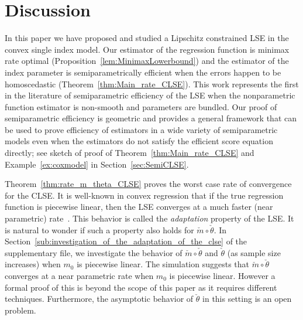 {\section{Discussion} \label{sec:discussion}
  In this paper we have proposed and studied a Lipschitz constrained LSE in the convex single index model. Our estimator  of the regression function is minimax rate optimal (Proposition~\ref{lem:MinimaxLowerbound}) and  the estimator of the index parameter is semiparametrically efficient when the errors happen to be homoscedastic (Theorem~\ref{thm:Main_rate_CLSE}). This work represents the first in the literature of semiparametric efficiency of the LSE when the nonparametric function estimator is non-smooth and parameters are bundled. Our proof of semiparametric efficiency is geometric and provides a general framework that can be used to prove efficiency of estimators in a wide variety of semiparametric models even when the estimators do not satisfy the efficient score equation directly; see sketch of proof of Theorem~\ref{thm:Main_rate_CLSE} and Example~\ref{ex:coxmodel} in Section~\ref{sec:SemiCLSE}. 



{Theorem~\ref{thm:rate_m_theta_CLSE} proves the worst case rate of convergence for the CLSE.  It is well-known in convex regression that if the true regression function is piecewise linear, then the LSE converges at a much faster (near parametric) rate~\cite{MR3881209}. This behavior is called the \emph{adaptation} property of the LSE.
It is natural to wonder if such a property also holds for $\check{m}\circ\check\theta$. In Section~\ref{sub:investigation_of_the_adaptation_of_the_clse} of the supplementary file, we investigate the behavior of  $\check{m}\circ\check\theta$ and $\check{\theta}$ (as sample size increases) when $m_0$ is piecewise linear. The simulation suggests that $\check{m}\circ\check{\theta}$ converges at a near parametric rate when $m_0$ is piecewise linear. However a formal proof of this is beyond the scope of this paper as it requires different techniques. Furthermore, the asymptotic behavior of $\check \theta$ in this setting is an open problem. 


}}
